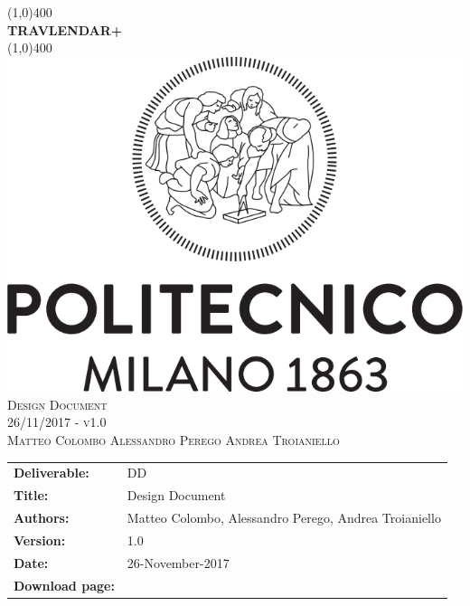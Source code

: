 
\usepackage{float}
\usepackage[section]{placeins}


\begin{titlepage}
	\begin{center}
		\line(1,0){400}\\	[0.6cm]
		\Huge{\bfseries{TRAVLENDAR+}}\\
		\line(1,0){400}\\
		[3cm]
		\includegraphics[scale=0.3]{Images/polimi}\\
		[3cm]
		\textsc{\Huge Design Document}\\[1cm]
		\textsc{\huge 26/11/2017 - v1.0}\\
		[4cm]
		\textsc{\normalsize Matteo Colombo \hspace{0.4cm} Alessandro Perego \hspace{0.4cm} Andrea Troianiello }
	\end{center}
\end{titlepage}
	
\begin{table}[h!]
\begin{tabu} to \textwidth { X[0.3,r,p] X[0.7,l,p] }
\hline

\textbf{Deliverable:} & DD\\
\textbf{Title:} & Design Document \\
\textbf{Authors:} & Matteo Colombo, Alessandro Perego, Andrea Troianiello \\
\textbf{Version:} & 1.0 \\ 
\textbf{Date:} & 26-November-2017 \\
\textbf{Download page:} & \href{https://github.com/MatteoColombo/ColomboPeregoTroianiello}{\color{Black}{GitHub - ColomboPeregoTroianiello repository}} \\
\hline
\end{tabu}
\end{table}

